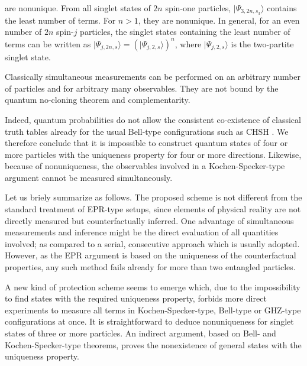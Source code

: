 \documentclass[pra,amsfonts,showpacs,preprint,showkeys]{revtex4}
\begin{document}
are nonunique.
From all  singlet states of $2n$ spin-one particles,
$\vert \Psi_{3,2n,s_3}\rangle$ contains the least number of terms.
For $n>1$, they are nonunique.
In general, for an even number of $2n$ spin-$j$ particles,
the singlet states containing the least number of terms
can be written as
$
\vert \Psi_{j,2n,s}\rangle = \left(\vert \Psi_{j,2,s}\rangle \right)^n
$,
where $\vert \Psi_{j,2,s}\rangle$ is the two-partite singlet state.

Classically simultaneous measurements can be performed
on an arbitrary number of particles and for arbitrary many observables.
They are not bound by the quantum no-cloning theorem and complementarity.

Indeed, quantum probabilities do not allow the consistent co-existence of
classical truth tables already for the usual Bell-type configurations such as CHSH
\cite{peres222,svozil-krenn}.
We therefore conclude that it is impossible to construct quantum states
of four or more particles with the uniqueness
property for four or more directions.
Likewise, because of nonuniqueness,
the observables involved in a Kochen-Specker-type argument
cannot be measured simultaneously.

Let us briely summarize as follows.
The proposed scheme is not different from the standard treatment of EPR-type setups,
since elements of physical reality are not directly measured
but counterfactually inferred.
One advantage of simultaneous measurements and inference might be  the
direct evaluation of all quantities involved; as compared to
a serial, consecutive approach which is usually adopted.
However, as the EPR argument is based on the uniqueness of the counterfactual properties,
any such method fails already for more than two entangled particles.

A new kind of protection scheme seems to emerge which,
due to the impossibility to find states with the required uniqueness property,
forbids more direct experiments
to measure all terms in Kochen-Specker-type,
Bell-type or GHZ-type configurations at once.
It is straightforward to deduce nonuniqueness
for singlet states of three or more particles.
An indirect argument, based on Bell- and Kochen-Specker-type theorems,
proves the nonexistence of general states with the uniqueness property.




%
%
%
%
\end{document}
